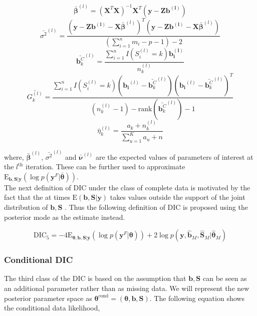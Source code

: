 $$\boldsymbol{\bar{\beta}}^{(l)} = (\boldsymbol{X}^T\boldsymbol{X})^{-1}\boldsymbol{X}^T(\boldsymbol{y}-\boldsymbol{Zb^{(l)}})$$
$$\bar{\sigma^2}^{(l)} = \frac {(\boldsymbol{y}-\boldsymbol{Zb^{(l)}}-\boldsymbol{X}\boldsymbol{\bar{\beta}}^{(l)})^T (\boldsymbol{y}-\boldsymbol{Zb^{(l)}}-\boldsymbol{X}\boldsymbol{\bar{\beta}}^{(l)})} {(\sum_{i=1}^n m_i - p - 1) -2}$$
$$\bar{\boldsymbol{b}_k^C}^{(l)} = \frac {\sum_{i=1}^n I(S_i^{(l)}=k) \boldsymbol{b_i^{(l)}}} {n_k^{(l)}}$$
$$\bar{G_k^{(l)}} = \frac {\sum_{i=1}^n I(S_i^{(l)}=k) (\boldsymbol{b_i}^{(l)}-\bar{\boldsymbol{b}_k^C}^{(l)})(\boldsymbol{b_i}^{(l)}-\bar{\boldsymbol{b}_k^C}^{(l)})^T} 
{(n_k^{(l)} - 1) - \text{rank}(\bar{\boldsymbol{b}_k^C}^{(l)}) - 1}$$
$$\bar{\eta}_k^{(l)} = \frac {a_k + n_k^{(l)}} {\sum_{u=1}^K a_u + n}$$

where, $\boldsymbol{\bar{\beta}}^{(l)}$, $\bar{\sigma^2}^{(l)}$ and $\boldsymbol{\bar{\nu}}^{(l)}$ are the expected values of parameters of interest at the $l^\text{th}$ iteration. These can be further used to approximate $\text{E}_{\boldsymbol{b}, \boldsymbol{S}|\boldsymbol{y}}(\log{p(\boldsymbol{y}^F|\boldsymbol{\bar{\theta}})})$.\\

The next definition of DIC under the class of complete data is motivated by the fact that the at times $\text{E}(\boldsymbol{b}, \boldsymbol{S}|\boldsymbol{y})$ takes values outside the support of the joint distribution of $\boldsymbol{b}, \boldsymbol{S}$ \citep{celeux_deviance_2006}. Thus the following definition of DIC is proposed using the posterior mode as the estimate instead.

\begin{equation}
\label{eq : DIC5}
\text{DIC}_5 = -4\text{E}_{\boldsymbol{\theta}, \boldsymbol{b}, \boldsymbol{S}|\boldsymbol{y}}(\log{p(\boldsymbol{y}^F|\boldsymbol{\theta})}) + 
2\log{p(\boldsymbol{y}, \boldsymbol{\hat{b}}_M, \boldsymbol{\hat{S}}_M|\boldsymbol{\hat{\theta}}_M)}
\end{equation}

\subsubsection{Conditional DIC}
The third class of the DIC is based on the assumption that $\boldsymbol{b}, \boldsymbol{S}$ can be seen as an additional parameter rather than as missing data. We will represent the new posterior parameter space as $\boldsymbol{\theta}^\text{cond} = (\boldsymbol{\theta}, \boldsymbol{b}, \boldsymbol{S})$. The following equation shows the conditional data likelihood,

